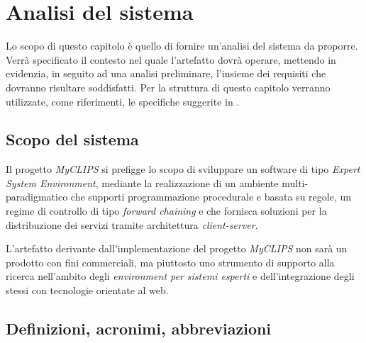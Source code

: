 
\chapter{Analisi del sistema}

Lo scopo di questo capitolo è quello di fornire un'analisi del sistema da proporre. Verrà specificato il contesto nel quale l'artefatto dovrà operare, mettendo in evidenzia, in seguito ad una analisi preliminare, l'insieme dei requisiti che dovranno risultare soddisfatti. Per la struttura di questo capitolo verranno utilizzate, come riferimenti, le specifiche suggerite in \cite{ieee830-1998}.

\section{Scopo del sistema}

Il progetto \emph{MyCLIPS} si prefigge lo scopo di sviluppare un software di tipo \emph{Expert System Environment}, mediante la realizzazione di un ambiente multi-paradigmatico che supporti programmazione procedurale e basata su regole, un regime di controllo di tipo \emph{forward chaining} e che fornisca soluzioni per la distribuzione dei servizi tramite architettura \emph{client-server}.

L'artefatto derivante dall'implementazione del progetto \emph{MyCLIPS} non sarà un prodotto con fini commerciali, ma piuttosto uno strumento di supporto alla ricerca nell'ambito degli \emph{environment per sistemi esperti} e dell'integrazione degli stessi con tecnologie orientate al web.

\section{Definizioni, acronimi, abbreviazioni}

